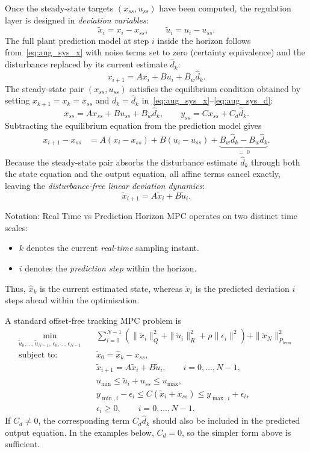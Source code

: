 Once the steady-state targets \((x_{ss}, u_{ss})\) have been computed, the
regulation layer is designed in \emph{deviation variables}:
\[
\tilde x_i = x_i - x_{ss}, \qquad \tilde u_i = u_i - u_{ss}.
\]
The full plant prediction model at step $i$ inside the horizon follows
from~\eqref{eq:aug_sys_x} with noise terms set to zero (certainty
equivalence) and the disturbance replaced by its current estimate
$\hat d_k$:
\[
x_{i+1} = A x_i + B u_i + B_w \hat d_k.
\]
The steady-state pair $(x_{ss}, u_{ss})$ satisfies the equilibrium
condition obtained by setting $x_{k+1} = x_k = x_{ss}$ and
$d_k = \hat d_k$ in~\eqref{eq:aug_sys_x}--\eqref{eq:aug_sys_d}:
\[
x_{ss} = A x_{ss} + B u_{ss} + B_w \hat d_k,
\qquad
y_{ss} = C x_{ss} + C_d \hat d_k.
\]
Subtracting the equilibrium equation from the prediction model gives
\begin{align*}
	x_{i+1} - x_{ss}
	&= A(x_i - x_{ss}) + B(u_i - u_{ss})
	+ \underbrace{B_w \hat d_k - B_w \hat d_k}_{=\;0}.
\end{align*}
Because the steady-state pair absorbs the disturbance estimate $\hat d_k$
through both the state equation and the output equation, all affine terms
cancel exactly, leaving the \emph{disturbance-free linear deviation
	dynamics}:
\[
\tilde x_{i+1} = A \tilde x_i + B \tilde u_i.
\]
\begin{notebox}{Notation: Real Time vs Prediction Horizon}
	MPC operates on two distinct time scales:
	\begin{itemize}
		\item \(k\) denotes the current \emph{real-time} sampling instant.
		\item \(i\) denotes the \emph{prediction step} within the horizon.
	\end{itemize}
	Thus, \(\hat x_k\) is the current estimated state, whereas \(\tilde x_i\) is the predicted deviation \(i\) steps ahead within the optimisation.
\end{notebox}

A standard offset-free tracking MPC problem is
\begin{align}
	\min_{\tilde u_0,\ldots,\tilde u_{N-1},\,\epsilon_0,\ldots,\epsilon_{N-1}} \quad &
	\sum_{i=0}^{N-1}
	\left(
	\|\tilde x_i\|_Q^2 + \|\tilde u_i\|_R^2 + \rho\|\epsilon_i\|^2
	\right)
	+ \|\tilde x_N\|_{P_{\mathrm{term}}}^2
	\label{eq:mpc_problem}\\
	\text{subject to:} \quad &
	\tilde x_0 = \hat x_k - x_{ss}, \nonumber\\
	&
	\tilde x_{i+1} = A\tilde x_i + B\tilde u_i, \qquad i=0,\ldots,N-1, \nonumber\\
	&
	u_{\min} \le \tilde u_i + u_{ss} \le u_{\max}, \nonumber\\
	&
	y_{\min,i} - \epsilon_i
	\le
	C(\tilde x_i + x_{ss})
	\le
	y_{\max,i} + \epsilon_i, \nonumber\\
	&
	\epsilon_i \ge 0, \qquad i=0,\ldots,N-1. \nonumber
\end{align}
If \(C_d \neq 0\), the corresponding term \(C_d \hat d_k\) should also be included in the predicted output equation. In the examples below, \(C_d=0\), so the simpler form above is sufficient.

